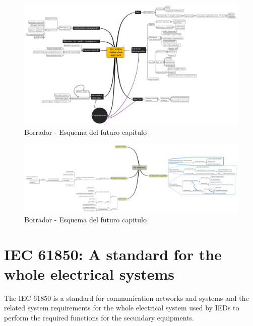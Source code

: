 \begin{figure}
  \includegraphics[width=1.0\textwidth]{appendices/IEC61850approach}
  \caption{Borrador - Esquema del futuro capitulo }
  \label{fig:lan-networks-topologies-fig3}
\end{figure}

\begin{figure}
  \includegraphics[width=1.0\textwidth]{appendices/IEC61850SCL}
  \caption{Borrador - Esquema del futuro capitulo }
  \label{fig:lan-networks-topologies-fig4}
\end{figure}


\section{IEC 61850: A standard for the whole electrical systems}

The IEC 61850 is a standard for communication networks and systems 
and the related system requirements for the whole electrical system
used by \Glspl{IED} to perform 
the required functions for the secundary equipments.

